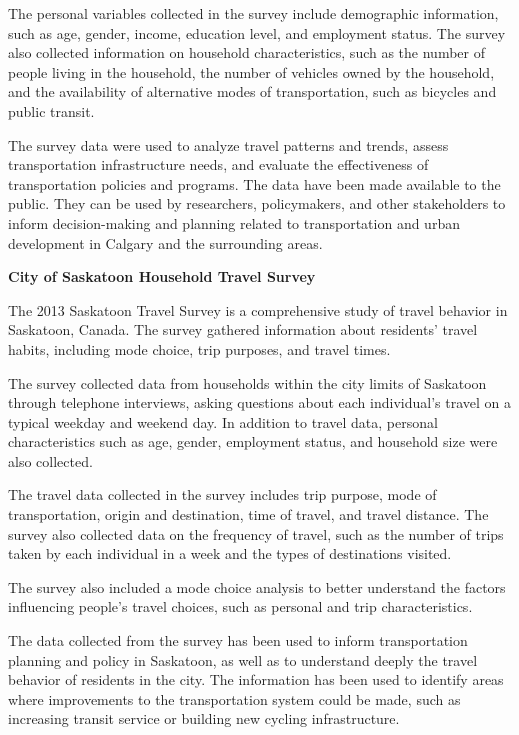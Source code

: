 \documentclass[12pt,twoside]{reedthesis}
\begin{document}
The personal variables collected in the survey include demographic information, such as age, gender, income, education level, and employment status. The survey also collected information on household characteristics, such as the number of people living in the household, the number of vehicles owned by the household, and the availability of alternative modes of transportation, such as bicycles and public transit.

The survey data were used to analyze travel patterns and trends, assess transportation infrastructure needs, and evaluate the effectiveness of transportation policies and programs. The data have been made available to the public. They can be used by researchers, policymakers, and other stakeholders to inform decision-making and planning related to transportation and urban development in Calgary and the surrounding areas.

\textbf{City of Saskatoon Household Travel Survey}

The 2013 Saskatoon Travel Survey is a comprehensive study of travel behavior in Saskatoon, Canada. The survey gathered information about residents' travel habits, including mode choice, trip purposes, and travel times.

The survey collected data from households within the city limits of Saskatoon through telephone interviews, asking questions about each individual's travel on a typical weekday and weekend day. In addition to travel data, personal characteristics such as age, gender, employment status, and household size were also collected.

The travel data collected in the survey includes trip purpose, mode of transportation, origin and destination, time of travel, and travel distance. The survey also collected data on the frequency of travel, such as the number of trips taken by each individual in a week and the types of destinations visited.

The survey also included a mode choice analysis to better understand the factors influencing people's travel choices, such as personal and trip characteristics.

The data collected from the survey has been used to inform transportation planning and policy in Saskatoon, as well as to understand deeply the travel behavior of residents in the city. The information has been used to identify areas where improvements to the transportation system could be made, such as increasing transit service or building new cycling infrastructure.
\end{document}
